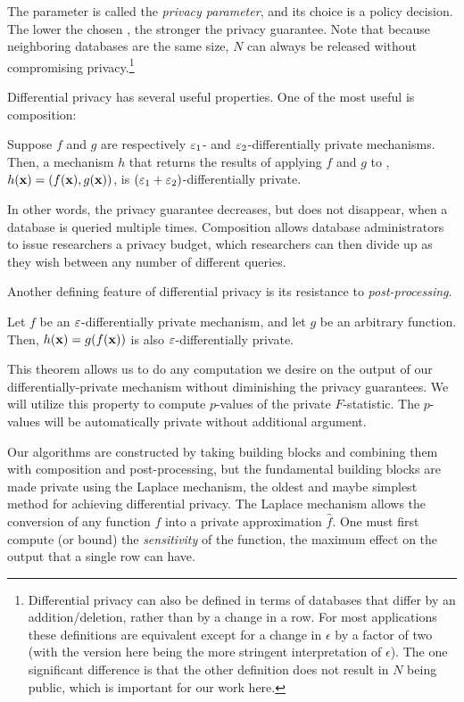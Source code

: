 The parameter \eps is called the \textit{privacy parameter}, and its choice is a policy decision. The lower the chosen \eps, the stronger the privacy guarantee. Note that because neighboring databases are the same size, $N$ can always be released without compromising privacy.\footnote{Differential privacy can also be defined in terms of databases that differ by an addition/deletion, rather than by a change in a row.  For most applications these definitions are equivalent except for a change in $\epsilon$ by a factor of two (with the version here being the more stringent interpretation of $\epsilon$). The one significant difference is that the other definition does not result in $N$ being public, which is important for our work here.}

Differential privacy has several useful properties.  One of the most useful is composition:

\begin{theorem}[Composition]\label{thm:composition} Suppose $f$ and $g$ are respectively $\varepsilon_{1}$- and $\varepsilon_{2}$-differentially private mechanisms. Then, a mechanism $h$ that returns the results of applying $f$ and $g$ to \x, $h(\mathbf{x}) = (f(\mathbf{x}), g(\mathbf{x}))$, is $(\varepsilon_{1} + \varepsilon_{2})$-differentially private.
\end{theorem}

In other words, the privacy guarantee decreases, but does not disappear, when a database is queried multiple times.  Composition allows database administrators to issue researchers a privacy budget, which researchers can then divide up as they wish between any number of different queries.

Another defining feature of differential privacy is its resistance to \textit{post-processing}.

\begin{theorem} \label{thm:postprocessing}
Let $f$ be an $\varepsilon$-differentially private mechanism, and let $g$ be an arbitrary function. Then, $h(\mathbf{x}) = g(f(\mathbf{x}))$ is also $\varepsilon$-differentially private.
\end{theorem}

This theorem allows us to do any computation we desire on the output of our differentially-private mechanism without diminishing the privacy guarantees. We will utilize this property to compute $p$-values of the private $F$-statistic.  The $p$-values will be automatically private without additional argument.

Our algorithms are constructed by taking building blocks and combining them with composition and post-processing, but the fundamental building blocks are made private using the Laplace mechanism, the oldest and maybe simplest method for achieving differential privacy.  The Laplace mechanism allows the conversion of any function $f$ into a private approximation $\hat{f}$. One must first compute (or bound) the \textit{sensitivity} of the function, the maximum effect on the output that a single row can have.

